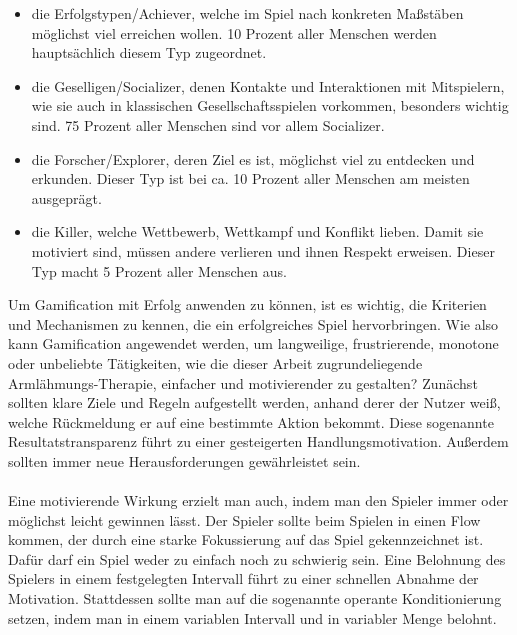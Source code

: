 \begin{itemize}
\item die Erfolgstypen/Achiever, welche im Spiel nach konkreten Maßstäben möglichst viel erreichen wollen.\cite{Src:Bartle} 10 Prozent aller Menschen werden hauptsächlich diesem Typ zugeordnet. \cite{Src:GamifDesign}
\item die Geselligen/Socializer, denen Kontakte und Interaktionen mit Mitspielern, wie sie auch in klassischen Gesellschaftsspielen vorkommen, besonders wichtig sind.\cite{Src:Bartle} 75 Prozent aller Menschen sind vor allem Socializer.\cite{Src:GamifDesign} 
\item die Forscher/Explorer, deren Ziel es ist, möglichst viel zu entdecken und erkunden.\cite{Src:Bartle} Dieser Typ ist bei ca. 10 Prozent aller Menschen am meisten ausgeprägt.\cite{Src:GamifDesign}
\item die Killer, welche Wettbewerb, Wettkampf und Konflikt lieben. Damit sie motiviert sind, müssen andere verlieren und ihnen Respekt erweisen.\cite{Src:Bartle} Dieser Typ macht 5 Prozent aller Menschen aus.\cite{Src:GamifDesign}
\end{itemize}
Um Gamification mit Erfolg anwenden zu können, ist es wichtig, die Kriterien und Mechanismen zu kennen, die ein erfolgreiches Spiel hervorbringen. Wie also kann Gamification angewendet werden, um langweilige, frustrierende, monotone oder unbeliebte Tätigkeiten, wie die dieser Arbeit zugrundeliegende Armlähmungs-Therapie, einfacher und motivierender zu gestalten? Zunächst sollten klare Ziele und Regeln aufgestellt werden, anhand derer der Nutzer weiß, welche Rückmeldung er auf eine bestimmte Aktion bekommt. Diese sogenannte Resultatstransparenz führt zu einer gesteigerten Handlungsmotivation.\cite{Src:GamifKochOtt} Außerdem sollten immer neue Herausforderungen gewährleistet sein.\cite{Src:WwieWissen}\\ \\
Eine motivierende Wirkung erzielt man auch, indem man den Spieler immer oder möglichst leicht gewinnen lässt. Der Spieler sollte beim Spielen in einen \glqq Flow\grqq ~ kommen, der durch eine starke Fokussierung auf das Spiel gekennzeichnet ist.\cite{Src:GamifDesign} Dafür darf ein Spiel weder zu einfach noch zu schwierig sein. Eine Belohnung des Spielers in einem festgelegten Intervall führt zu einer schnellen Abnahme der Motivation. Stattdessen sollte man auf die sogenannte operante Konditionierung setzen, indem man in einem variablen Intervall und in variabler Menge belohnt.\cite{Src:GamifDesign} \\ \\
